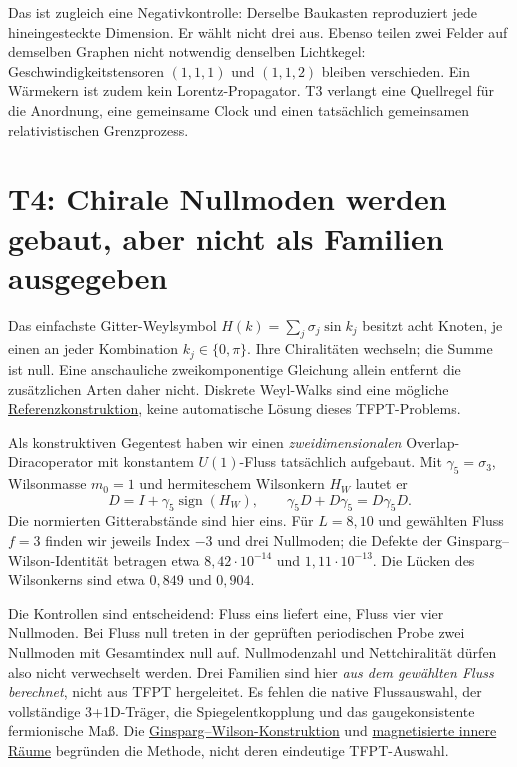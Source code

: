 Das ist zugleich eine Negativkontrolle: Derselbe Baukasten reproduziert jede hineingesteckte Dimension. Er wählt nicht drei aus. Ebenso teilen zwei Felder auf demselben Graphen nicht notwendig denselben Lichtkegel: Geschwindigkeitstensoren $(1,1,1)$ und $(1,1,2)$ bleiben verschieden. Ein Wärmekern ist zudem kein Lorentz-Propagator. T3 verlangt eine Quellregel für die Anordnung, eine gemeinsame Clock und einen tatsächlich gemeinsamen relativistischen Grenzprozess.

\section{T4: Chirale Nullmoden werden gebaut, aber nicht als Familien ausgegeben}
Das einfachste Gitter-Weylsymbol $H(k)=\sum_j\sigma_j\sin k_j$ besitzt acht Knoten, je einen an jeder Kombination $k_j\in\{0,\pi\}$. Ihre Chiralitäten wechseln; die Summe ist null. Eine anschauliche zweikomponentige Gleichung allein entfernt die zusätzlichen Arten daher nicht. Diskrete Weyl-Walks sind eine mögliche \href{https://arxiv.org/abs/1708.00826}{Referenzkonstruktion}, keine automatische Lösung dieses TFPT-Problems.

Als konstruktiven Gegentest haben wir einen \emph{zweidimensionalen} Overlap-Diracoperator mit konstantem $U(1)$-Fluss tatsächlich aufgebaut. Mit $\gamma_5=\sigma_3$, Wilsonmasse $m_0=1$ und hermiteschem Wilsonkern $H_W$ lautet er
\begin{equation}
D=I+\gamma_5\operatorname{sign}(H_W),\qquad
\gamma_5D+D\gamma_5=D\gamma_5D.
\end{equation}
Die normierten Gitterabstände sind hier eins. Für $L=8,10$ und gewählten Fluss $f=3$ finden wir jeweils Index $-3$ und drei Nullmoden; die Defekte der Ginsparg--Wilson-Identität betragen etwa $8{,}42\cdot10^{-14}$ und $1{,}11\cdot10^{-13}$. Die Lücken des Wilsonkerns sind etwa $0{,}849$ und $0{,}904$.

Die Kontrollen sind entscheidend: Fluss eins liefert eine, Fluss vier vier Nullmoden. Bei Fluss null treten in der geprüften periodischen Probe zwei Nullmoden mit Gesamtindex null auf. Nullmodenzahl und Nettchiralität dürfen also nicht verwechselt werden. Drei Familien sind hier \emph{aus dem gewählten Fluss berechnet}, nicht aus TFPT hergeleitet. Es fehlen die native Flussauswahl, der vollständige 3+1D-Träger, die Spiegelentkopplung und das gaugekonsistente fermionische Maß. Die \href{https://arxiv.org/abs/hep-lat/9802011}{Ginsparg--Wilson-Konstruktion} und \href{https://arxiv.org/abs/hep-th/0404229}{magnetisierte innere Räume} begründen die Methode, nicht deren eindeutige TFPT-Auswahl.

